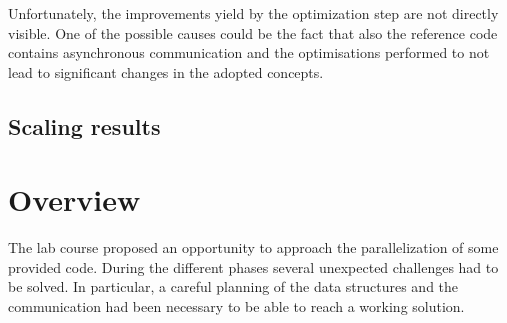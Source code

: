 \documentclass[12pt, a4paper]{article}
\begin{document}
Unfortunately, the improvements yield by the optimization step are not directly
visible. One of the possible causes could be the fact that also the reference
code contains asynchronous communication and the optimisations performed to not
lead to significant changes in the adopted concepts.

\subsection*{Scaling results}


\section{Overview}
The lab course proposed an opportunity to approach the parallelization of some
provided code. During the different phases several unexpected challenges had to
be solved. In particular, a careful planning of the data structures and the
communication had been necessary to be able to reach a working solution.
\end{document}
